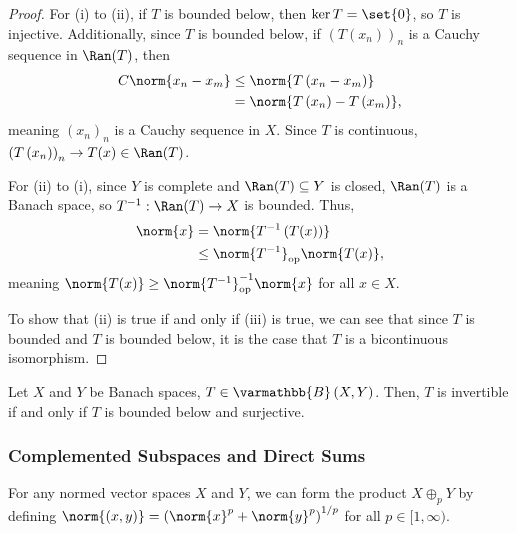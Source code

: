 \documentclass[10pt]{mypackage}
\renewcommand*{\mathbb}[1]{\varmathbb{#1}}
\newcommand{\B}{\mathbb{B}}
\begin{document}
  \begin{proof}
    For (i) to (ii), if $T$ is bounded below, then $\ker T = \set{0}$, so $T$ is injective. Additionally, since $T$ is bounded below, if $\left(T\left(x_n\right)\right)_n$ is a Cauchy sequence in $\Ran(T)$, then
    \begin{align*}
      C\norm{x_n - x_m} &\leq \norm{T\left(x_n - x_m\right)}\\
                        &= \norm{T\left(x_n\right) - T\left(x_m\right)},
    \end{align*}
    meaning $\left(x_n\right)_n$ is a Cauchy sequence in $X$. Since $T$ is continuous, $\left(T\left(x_n\right)\right)_n \rightarrow T(x)\in \Ran(T)$.\newline

    For (ii) to (i), since $Y$ is complete and $\Ran(T)\subseteq Y$ is closed, $\Ran(T)$ is a Banach space, so $T^{-1}:\Ran(T) \rightarrow X$ is bounded. Thus,
    \begin{align*}
      \norm{x} &= \norm{T^{-1}\left(T(x)\right)}\\
               &\leq \norm{T^{-1}}_{\text{op}}\norm{T(x)},
    \end{align*}
    meaning $\norm{T(x)}\geq \norm{T^{-1}}_{\text{op}}^{-1}\norm{x}$ for all $x\in X$.\newline

    To show that (ii) is true if and only if (iii) is true, we can see that since $T$ is bounded and $T$ is bounded below, it is the case that $T$ is a bicontinuous isomorphism.
  \end{proof}
  \begin{corollary}
    Let $X$ and $Y$ be Banach spaces, $T\in \B\left(X,Y\right)$. Then, $T$ is invertible if and only if $T$ is bounded below and surjective.
  \end{corollary}
  \subsubsection{Complemented Subspaces and Direct Sums}%
  For any normed vector spaces $X$ and $Y$, we can form the product $X\oplus_{p}Y$ by defining $\norm{\left(x,y\right)} = \left(\norm{x}^p + \norm{y}^p\right)^{1/p}$ for all $p\in [1,\infty)$.\newline
\end{document}
